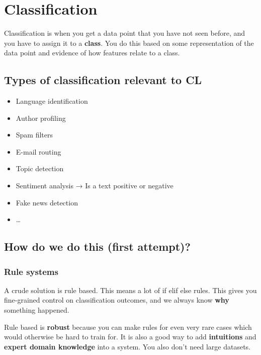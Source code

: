 \documentclass[
  11pt,
  british,
]{article}
\providecommand{\tightlist}{%
  \setlength{\itemsep}{0pt}\setlength{\parskip}{0pt}}
\begin{document}
\hypertarget{classification}{%
\section{Classification}\label{classification}}

Classification is when you get a data point that you have not seen
before, and you have to assign it to a \textbf{class}. You do this based
on some representation of the data point and evidence of how features
relate to a class.

\hypertarget{types-of-classification-relevant-to-cl}{%
\subsection{Types of classification relevant to
CL}\label{types-of-classification-relevant-to-cl}}

\begin{itemize}
\tightlist
\item
  Language identification
\item
  Author profiling
\item
  Spam filters
\item
  E-mail routing
\item
  Topic detection
\item
  Sentiment analysis → Is a text positive or negative
\item
  Fake news detection
\item
  \ldots{}
\end{itemize}

\hypertarget{how-do-we-do-this-first-attempt}{%
\subsection{How do we do this (first
attempt)?}\label{how-do-we-do-this-first-attempt}}

\hypertarget{rule-systems}{%
\subsubsection{Rule systems}\label{rule-systems}}

A crude solution is rule based. This means a lot of if elif else rules.
This gives you fine-grained control on classification outcomes, and we
always know \textbf{why} something happened.

Rule based is \textbf{robust} because you can make rules for even very
rare cases which would otherwise be hard to train for. It is also a good
way to add \textbf{intuitions} and \textbf{expert domain knowledge} into
a system. You also don't need large datasets.
\end{document}

